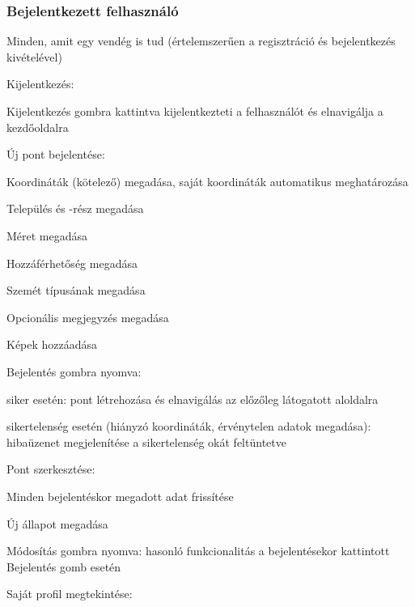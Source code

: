 \subsubsection{Bejelentkezett felhasználó}
\begin{compactitem}
	\item Minden, amit egy vendég is tud (értelemszerűen a regisztráció és bejelentkezés kivételével)
	\item Kijelentkezés:
	\begin{compactitem}
		\item Kijelentkezés gombra kattintva kijelentkezteti a felhasználót és elnavigálja a kezdőoldalra
	\end{compactitem}
	\item Új pont bejelentése:
	\begin{compactitem}
		\item Koordináták (kötelező) megadása, saját koordináták automatikus meghatározása
		\item Település és -rész megadása
		\item Méret megadása
		\item Hozzáférhetőség megadása
		\item Szemét típusának megadása
		\item Opcionális megjegyzés megadása
		\item Képek hozzáadása
		\item Bejelentés gombra nyomva:
		\begin{compactitem}
			\item siker esetén: pont létrehozása és elnavigálás az előzőleg látogatott aloldalra
			\item sikertelenség esetén (hiányzó koordináták, érvénytelen adatok megadása): hibaüzenet megjelenítése a sikertelenség okát feltüntetve
		\end{compactitem}
	\end{compactitem}
	\item Pont szerkesztése:
	\begin{compactitem}
		\item Minden bejelentéskor megadott adat frissítése
		\item Új állapot megadása
		\item Módosítás gombra nyomva: hasonló funkcionalitás a bejelentésekor kattintott Bejelentés gomb esetén
	\end{compactitem}
	\item Saját profil megtekintése:
	\begin{compactitem}

\end{compactitem}
\end{compactitem}
